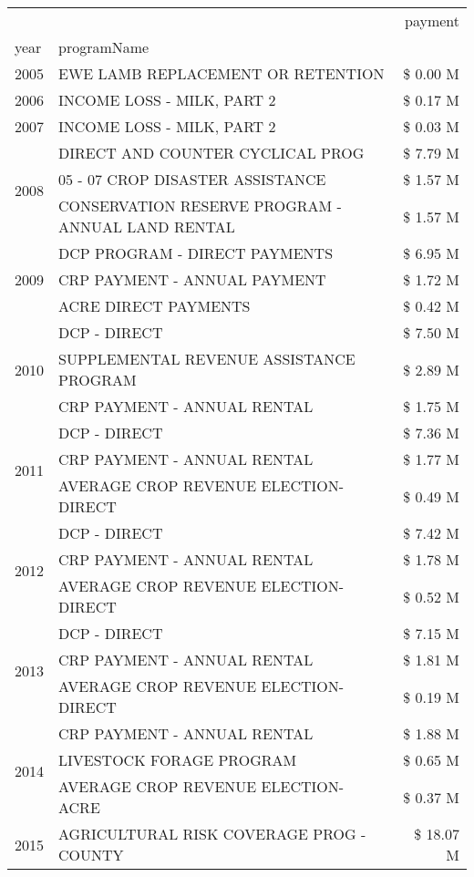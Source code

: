 \begin{tabular}{llr}
\toprule
 &  & payment \\
year & programName &  \\
\midrule
2005 & EWE LAMB REPLACEMENT OR RETENTION & \$ 0.00 M \\
\cline{1-3}
2006 & INCOME LOSS - MILK, PART 2 & \$ 0.17 M \\
\cline{1-3}
2007 & INCOME LOSS - MILK, PART 2 & \$ 0.03 M \\
\cline{1-3}
\multirow[t]{3}{*}{2008} & DIRECT AND COUNTER CYCLICAL PROG & \$ 7.79 M \\
 & 05 - 07 CROP DISASTER ASSISTANCE & \$ 1.57 M \\
 & CONSERVATION RESERVE PROGRAM - ANNUAL LAND RENTAL & \$ 1.57 M \\
\cline{1-3}
\multirow[t]{3}{*}{2009} & DCP PROGRAM - DIRECT PAYMENTS & \$ 6.95 M \\
 & CRP PAYMENT - ANNUAL PAYMENT & \$ 1.72 M \\
 & ACRE DIRECT PAYMENTS & \$ 0.42 M \\
\cline{1-3}
\multirow[t]{3}{*}{2010} & DCP - DIRECT & \$ 7.50 M \\
 & SUPPLEMENTAL REVENUE ASSISTANCE PROGRAM & \$ 2.89 M \\
 & CRP PAYMENT - ANNUAL RENTAL & \$ 1.75 M \\
\cline{1-3}
\multirow[t]{3}{*}{2011} & DCP - DIRECT & \$ 7.36 M \\
 & CRP PAYMENT - ANNUAL RENTAL & \$ 1.77 M \\
 & AVERAGE CROP REVENUE ELECTION-DIRECT & \$ 0.49 M \\
\cline{1-3}
\multirow[t]{3}{*}{2012} & DCP - DIRECT & \$ 7.42 M \\
 & CRP PAYMENT - ANNUAL RENTAL & \$ 1.78 M \\
 & AVERAGE CROP REVENUE ELECTION-DIRECT & \$ 0.52 M \\
\cline{1-3}
\multirow[t]{3}{*}{2013} & DCP - DIRECT & \$ 7.15 M \\
 & CRP PAYMENT - ANNUAL RENTAL & \$ 1.81 M \\
 & AVERAGE CROP REVENUE ELECTION-DIRECT & \$ 0.19 M \\
\cline{1-3}
\multirow[t]{3}{*}{2014} & CRP PAYMENT - ANNUAL RENTAL & \$ 1.88 M \\
 & LIVESTOCK FORAGE PROGRAM & \$ 0.65 M \\
 & AVERAGE CROP REVENUE ELECTION-ACRE & \$ 0.37 M \\
\cline{1-3}
\multirow[t]{3}{*}{2015} & AGRICULTURAL RISK COVERAGE PROG - COUNTY & \$ 18.07 M \\

\end{tabular}
